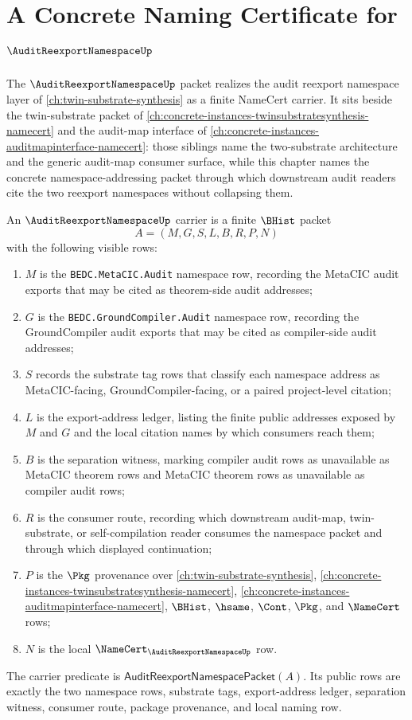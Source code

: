 \chapter{A Concrete Naming Certificate for $\AuditReexportNamespaceUp$}
\label{ch:concrete-instances-auditreexportnamespace-namecert}

The $\AuditReexportNamespaceUp$ packet realizes the audit reexport namespace layer of \autoref{ch:twin-substrate-synthesis} as a finite NameCert carrier. It sits beside the twin-substrate packet of \autoref{ch:concrete-instances-twinsubstratesynthesis-namecert} and the audit-map interface of \autoref{ch:concrete-instances-auditmapinterface-namecert}: those siblings name the two-substrate architecture and the generic audit-map consumer surface, while this chapter names the concrete namespace-addressing packet through which downstream audit readers cite the two reexport namespaces without collapsing them.

\begin{definition}
\label{def:audit-reexport-namespace-carrier}
An $\AuditReexportNamespaceUp$ carrier is a finite $\BHist$ packet
$$
A=(M,G,S,L,B,R,P,N)
$$
with the following visible rows:
\begin{enumerate}
\item $M$ is the \texttt{BEDC.MetaCIC.Audit} namespace row, recording the MetaCIC audit exports that may be cited as theorem-side audit addresses;
\item $G$ is the \texttt{BEDC.GroundCompiler.Audit} namespace row, recording the GroundCompiler audit exports that may be cited as compiler-side audit addresses;
\item $S$ records the substrate tag rows that classify each namespace address as MetaCIC-facing, GroundCompiler-facing, or a paired project-level citation;
\item $L$ is the export-address ledger, listing the finite public addresses exposed by $M$ and $G$ and the local citation names by which consumers reach them;
\item $B$ is the separation witness, marking compiler audit rows as unavailable as MetaCIC theorem rows and MetaCIC theorem rows as unavailable as compiler audit rows;
\item $R$ is the consumer route, recording which downstream audit-map, twin-substrate, or self-compilation reader consumes the namespace packet and through which displayed continuation;
\item $P$ is the $\Pkg$ provenance over \autoref{ch:twin-substrate-synthesis}, \autoref{ch:concrete-instances-twinsubstratesynthesis-namecert}, \autoref{ch:concrete-instances-auditmapinterface-namecert}, $\BHist$, $\hsame$, $\Cont$, $\Pkg$, and $\NameCert$ rows;
\item $N$ is the local $\NameCert_{\AuditReexportNamespaceUp}$ row.
\end{enumerate}
The carrier predicate is $\mathsf{AuditReexportNamespacePacket}(A)$. Its public rows are exactly the two namespace rows, substrate tags, export-address ledger, separation witness, consumer route, package provenance, and local naming row.
\end{definition}

